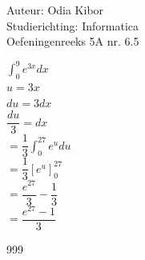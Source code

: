 \documentclass[a4paper]{article}
\begin{document}
  
\noindent \large Auteur: Odia Kibor \\
\noindent \large Studierichting: Informatica\\
\noindent \large Oefeningenreeks 5A nr. 6.5
\\

\medskip

\normalsize


$\displaystyle\int_{0}^{9} e^{3x} dx $\\

$u = 3x$\\

$du = 3dx$\\

$\dfrac{du}{3} = dx$\\

$= \dfrac{1}{3} \displaystyle\int_{0}^{27} e^u du$\\

$= \dfrac{1}{3}\left[e^u \right]_{0}^{27} $\\

$= \dfrac{e^{27}}{3} - \dfrac{1}{3}$\\

$ = \dfrac{e^{27} - 1}{3}$\\

















\begin{thebibliography}{999}
\end{thebibliography}
\end{document}
